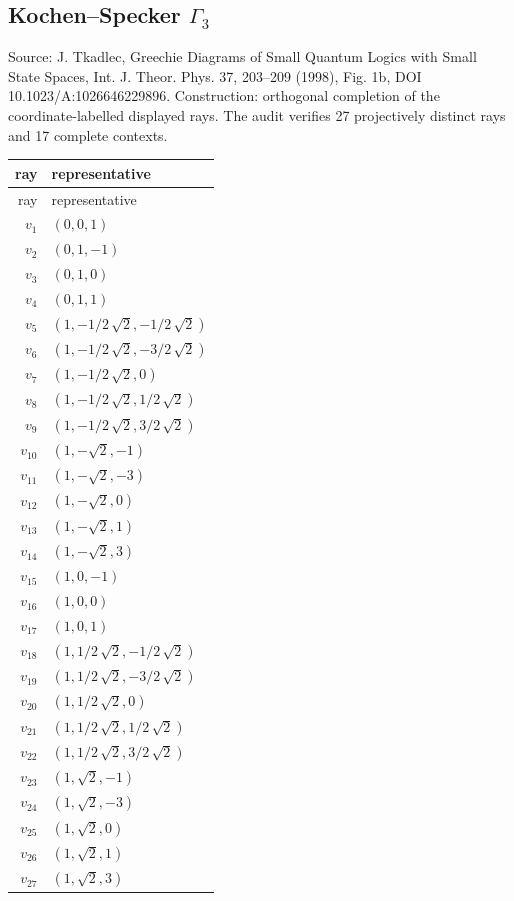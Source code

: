 \subsection{Kochen--Specker \texorpdfstring{$\Gamma_3$}{Gamma3}}
\begingroup\sloppy Source: J. Tkadlec, Greechie Diagrams of Small Quantum Logics with Small State Spaces, Int. J. Theor. Phys. 37, 203--209 (1998), Fig. 1b, DOI 10.1023/A:1026646229896.  Construction: orthogonal completion of the coordinate-labelled displayed rays. The audit verifies 27 projectively distinct rays and 17 complete contexts.\par\endgroup
\begin{longtable}{@{}r l@{}}
\toprule
ray & representative\\
\midrule
\endfirsthead
\toprule
ray & representative\\
\midrule
\endhead
$v_{1}$ & $(0,0,1)$\\
$v_{2}$ & $(0,1,-1)$\\
$v_{3}$ & $(0,1,0)$\\
$v_{4}$ & $(0,1,1)$\\
$v_{5}$ & $(1,-1/2\,\sqrt{2},-1/2\,\sqrt{2})$\\
$v_{6}$ & $(1,-1/2\,\sqrt{2},-3/2\,\sqrt{2})$\\
$v_{7}$ & $(1,-1/2\,\sqrt{2},0)$\\
$v_{8}$ & $(1,-1/2\,\sqrt{2},1/2\,\sqrt{2})$\\
$v_{9}$ & $(1,-1/2\,\sqrt{2},3/2\,\sqrt{2})$\\
$v_{10}$ & $(1,-\sqrt{2},-1)$\\
$v_{11}$ & $(1,-\sqrt{2},-3)$\\
$v_{12}$ & $(1,-\sqrt{2},0)$\\
$v_{13}$ & $(1,-\sqrt{2},1)$\\
$v_{14}$ & $(1,-\sqrt{2},3)$\\
$v_{15}$ & $(1,0,-1)$\\
$v_{16}$ & $(1,0,0)$\\
$v_{17}$ & $(1,0,1)$\\
$v_{18}$ & $(1,1/2\,\sqrt{2},-1/2\,\sqrt{2})$\\
$v_{19}$ & $(1,1/2\,\sqrt{2},-3/2\,\sqrt{2})$\\
$v_{20}$ & $(1,1/2\,\sqrt{2},0)$\\
$v_{21}$ & $(1,1/2\,\sqrt{2},1/2\,\sqrt{2})$\\
$v_{22}$ & $(1,1/2\,\sqrt{2},3/2\,\sqrt{2})$\\
$v_{23}$ & $(1,\sqrt{2},-1)$\\
$v_{24}$ & $(1,\sqrt{2},-3)$\\
$v_{25}$ & $(1,\sqrt{2},0)$\\
$v_{26}$ & $(1,\sqrt{2},1)$\\
$v_{27}$ & $(1,\sqrt{2},3)$\\
\bottomrule
\end{longtable}

